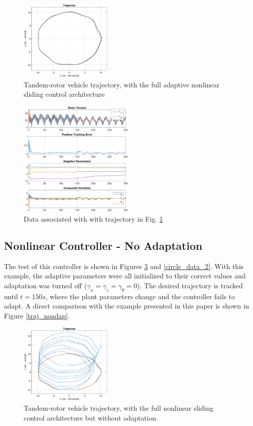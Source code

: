 \documentclass[letterpaper, 10 pt, conference]{ieeeconf}\usepackage[margin=1in]{geometry}
\begin{document}
\begin{figure}[h!]
	\centering
	\includegraphics[width=0.4\textwidth]{circle_full_controller_traj}
	\caption{Tandem-rotor vehicle trajectory, with the full adaptive nonlinear sliding control architecture}
	\label{circle_traj_1}
\end{figure}

\begin{figure}[h!]
	\centering
	\includegraphics[width=0.5\textwidth]{circle_full_controller}
	\caption{Data associated with with trajectory in Fig. \ref{circle_traj_1}}
	\label{circle_data_1}
\end{figure}

\subsection{Nonlinear Controller - No Adaptation}
The test of this controller is shown in Figures \ref{circle_traj_2} and \ref{circle_data_2}. With this example, the adaptive parameters were all initialized to their correct values and adaptation was turned off ($\gamma_x = \gamma_z = \gamma_\theta = 0$). The desired trajectory is tracked until $t = 150s$, where the plant parameters change and the controller fails to adapt. A direct comparison with the example presented in this paper is shown in Figure \ref{traj_noadap}.

\begin{figure}[h!]
	\centering
	\includegraphics[width=0.4\textwidth]{circle_noadap_traj}
	\caption{Tandem-rotor vehicle trajectory, with the full nonlinear sliding control architecture but without adaptation}
	\label{circle_traj_2}
\end{figure}
\end{document}

